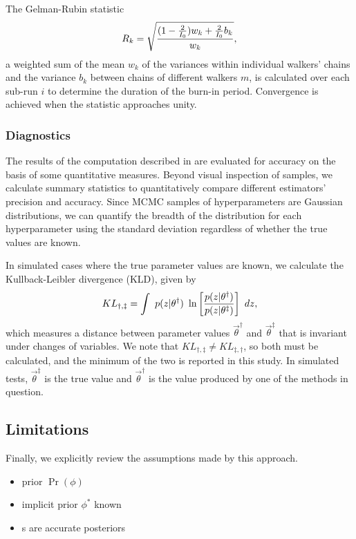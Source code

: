 The Gelman-Rubin statistic
\begin{equation}
\eqlabel{eq:gr}
R_{k} = \sqrt{\frac{(1-\frac{2}{I_{0}})w_{k}+\frac{2}{I_{0}}b_{k}}{w_{k}}},
\end{equation}
a weighted sum of the mean $w_{k}$ of the variances within individual walkers' chains and the variance $b_{k}$ between chains of different walkers $m$, is calculated over each sub-run $i$ to determine the duration of the burn-in period.  
Convergence is achieved when the statistic approaches unity.  

\subsubsection{Diagnostics}

The results of the computation described in  are evaluated for accuracy on the basis of some quantitative measures.  
Beyond visual inspection of samples, we calculate summary statistics to quantitatively compare different estimators' precision and accuracy.  
Since MCMC samples of hyperparameters are Gaussian distributions, we can quantify the breadth of the distribution for each hyperparameter using the standard deviation regardless of whether the true values are known.  

In simulated cases where the true parameter values are known, we calculate the Kullback-Leibler divergence (KLD), given by 
\begin{equation}
\eqlabel{eq:kl}
KL_{\dagger,\ddagger} = \int\ p(z|\theta^{\dagger})\ \ln\left[\frac{p(z|\theta^{\dagger})}{p(z|\theta^{\ddagger})}\right]\ dz,
\end{equation}
which measures a distance between parameter values $\vec{\theta}^{\dagger}$ and $\vec{\theta}^{\ddagger}$ that is invariant under changes of variables.  
We note that $KL_{\dagger,\ddagger}\neq KL_{\ddagger,\dagger}$, so both must be calculated, and the minimum of the two is reported in this study.  
In simulated tests, $\vec{\theta}^{\ddagger}$ is the true value and $\vec{\theta}^{\dagger}$ is the value produced by one of the methods in question.  

\subsection{Limitations}

Finally, we explicitly review the assumptions made by this approach.
\begin{itemize}
	\item prior $\Pr(\phi)$
	\item implicit prior $\phi^{*}$ known
	\item \pzpdf s are accurate posteriors
\end{itemize}



